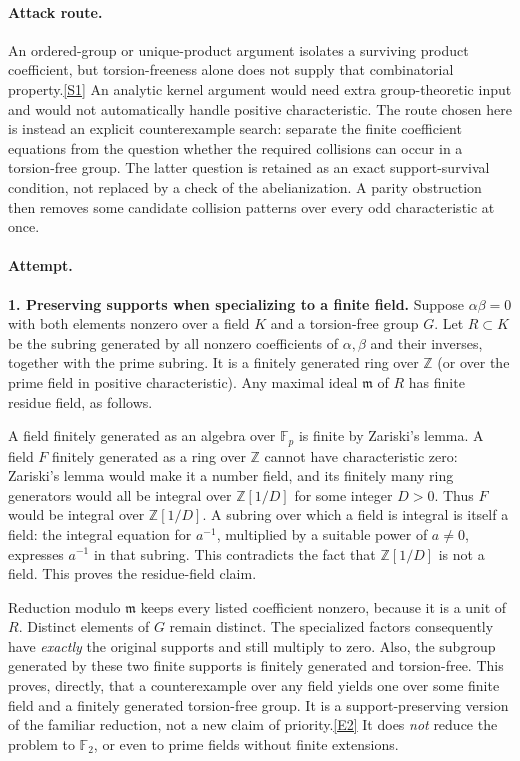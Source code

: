 \documentclass[11pt,a4paper]{article}
\newcommand{\Z}{\mathbb{Z}}
\newcommand{\F}{\mathbb{F}}
\newcommand{\sref}[2]{\hyperlink{source:#1:#2}{[S#2]}}
\newcommand{\eref}[2]{\hyperlink{extra:#1:#2}{[E#2]}}
\begin{document}
\paragraph{Attack route.}
An ordered-group or unique-product argument isolates a surviving product
coefficient, but torsion-freeness alone does not supply that combinatorial
property.\sref{204}{1}
An analytic kernel argument would need extra group-theoretic input and
would not automatically handle positive characteristic. The route chosen
here is instead an explicit counterexample search: separate the finite
coefficient equations from the question whether the required collisions
can occur in a torsion-free group. The latter question is retained as an
exact support-survival condition, not replaced by a check of the
abelianization. A parity obstruction then removes some candidate collision
patterns over every odd characteristic at once.

\paragraph{Attempt.}
\textbf{1. Preserving supports when specializing to a finite field.}
Suppose $\alpha\beta=0$ with both elements nonzero over a field $K$ and a
torsion-free group $G$. Let $R\subset K$ be the subring generated by all
nonzero coefficients of $\alpha,\beta$ and their inverses, together with
the prime subring. It is a finitely generated ring over $\Z$ (or over the
prime field in positive characteristic). Any maximal ideal $\mathfrak m$
of $R$ has finite residue field, as follows.

A field finitely generated as an algebra over $\F_p$ is finite by
Zariski's lemma. A field $F$ finitely generated as a ring over $\Z$ cannot
have characteristic zero: Zariski's lemma would make it a number field,
and its finitely many ring generators would all be integral over
$\Z[1/D]$ for some integer $D>0$. Thus $F$ would be integral over
$\Z[1/D]$. A subring over which a field is integral is itself a field:
the integral equation for $a^{-1}$, multiplied by a suitable power of
$a\ne0$, expresses $a^{-1}$ in that subring. This contradicts the fact
that $\Z[1/D]$ is not a field. This proves the residue-field claim.

Reduction modulo $\mathfrak m$ keeps every listed coefficient nonzero,
because it is a unit of $R$. Distinct elements of $G$ remain distinct.
The specialized factors consequently have \emph{exactly} the original
supports and still multiply to zero. Also, the subgroup generated by
these two finite supports is finitely generated and torsion-free.
This proves, directly, that a counterexample over any field yields one
over some finite field and a finitely generated torsion-free group.
It is a support-preserving version of the familiar reduction, not a new
claim of priority.\eref{204}{2}
It does \emph{not} reduce the problem to $\F_2$, or even to prime fields
without finite extensions.
\end{document}
